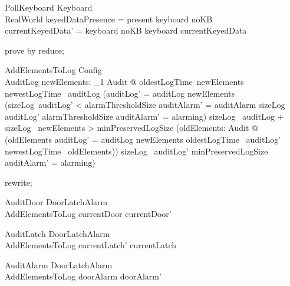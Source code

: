 \begin{schema}{PollKeyboard}
  \Delta Keyboard\\
  RealWorld
\where
  keyedDataPresence = present \iff  keyboard \neq  noKB\\
  currentKeyedData' = \IF  keyboard \neq  noKB \THEN  keyboard \ELSE  currentKeyedData
\end{schema}


\begin{zproof}[gTIMEMaxType]
prove by reduce;
\end{zproof}

\begin{schema}{AddElementsToLog}
  Config\\
  \Delta AuditLog
\where
  \exists  newElements: \finset_1  Audit @ oldestLogTime~newElements \geq  newestLogTime~ auditLog \land  (auditLog' = auditLog \cup  newElements \land  (sizeLog~auditLog' < alarmThresholdSize \land  auditAlarm' = auditAlarm \lor  sizeLog~ auditLog' \geq  alarmThresholdSize \land  auditAlarm' = alarming) \lor  sizeLog~ auditLog + sizeLog~ newElements > minPreservedLogSize \land  (\exists  oldElements: \finset  Audit @ (oldElements \cup  auditLog' = auditLog \cup  newElements \land  oldestLogTime~ auditLog' \geq  newestLogTime~ oldElements)) \land  sizeLog~ auditLog' \geq  minPreservedLogSize \land  auditAlarm' = alarming)
\end{schema}

\begin{zproof}
rewrite;
\end{zproof}

\begin{schema}{AuditDoor}
  \Delta DoorLatchAlarm\\
  AddElementsToLog
\where
  currentDoor \neq  currentDoor'
\end{schema}

\begin{schema}{AuditLatch}
  \Delta DoorLatchAlarm\\
  AddElementsToLog
\where
  currentLatch' \neq  currentLatch
\end{schema}

\begin{schema}{AuditAlarm}
  \Delta DoorLatchAlarm\\
  AddElementsToLog
\where
  doorAlarm \neq  doorAlarm'
\end{schema}

